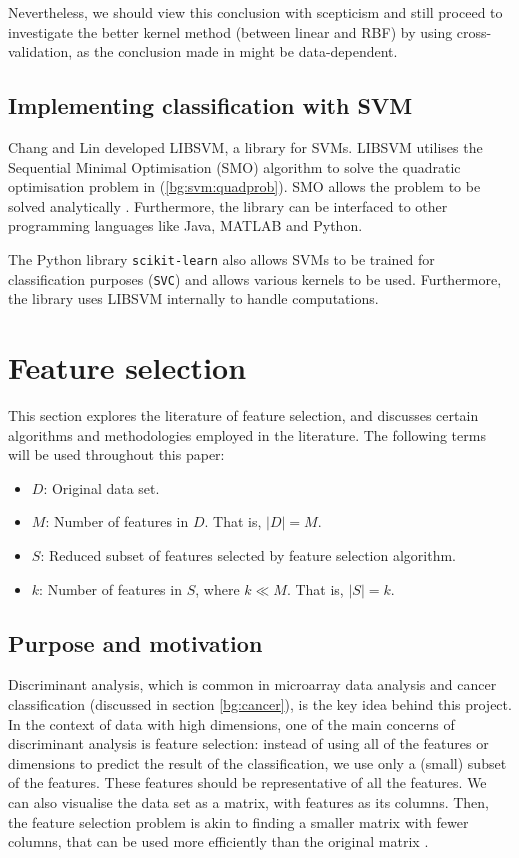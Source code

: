 \documentclass[12pt, twoside, a4paper]{report}
\begin{document}
Nevertheless, we should view this conclusion with scepticism and still proceed to investigate the better kernel method (between linear and RBF) by using cross-validation, as the conclusion made in \cite{RefWorks:128} might be data-dependent.

\subsection{Implementing classification with SVM}
Chang and Lin \cite{libsvm} developed LIBSVM, a library for SVMs. LIBSVM utilises the Sequential Minimal Optimisation (SMO) algorithm to solve the quadratic optimisation problem in (\ref{bg:svm:quadprob}). SMO allows the problem to be solved analytically \cite{RefWorks:126}. Furthermore, the library can be interfaced to other programming languages like Java, MATLAB and Python.

The Python library \texttt{scikit-learn} also allows SVMs to be trained for classification purposes (\texttt{SVC}) and allows various kernels to be used. Furthermore, the library uses LIBSVM internally to handle computations.

\section{Feature selection} \label{bg:feature_selection}

This section explores the literature of feature selection, and discusses certain algorithms and methodologies employed in the literature. The following terms will be used throughout this paper:
\begin{itemize}
  \item $D$: Original data set.
  \item $M$: Number of features in $D$. That is, $|D| = M$.
  \item $S$: Reduced subset of features selected by feature selection algorithm.
  \item $k$: Number of features in $S$, where $k \ll M$. That is, $|S| = k$.
\end{itemize}

\subsection{Purpose and motivation} \label{bg:fs:purpose}

Discriminant analysis, which is common in microarray data analysis and cancer classification (discussed in section \ref{bg:cancer}), is the key idea behind this project. In the context of data with high dimensions, one of the main concerns of discriminant analysis is feature selection: instead of using all of the features or dimensions to predict the result of the classification, we use only a (small) subset of the features. These features should be representative of all the features. We can also visualise the data set as a matrix, with features as its columns. Then, the feature selection problem is akin to finding a smaller matrix with fewer columns, that can be used more efficiently than the original matrix \cite{RefWorks:163}.
\end{document}
